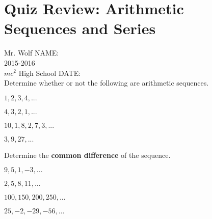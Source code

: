 \documentclass[12pt]{article}
\begin{document}
\section*{Quiz Review: Arithmetic Sequences and Series}

Mr. Wolf \hfill NAME:\underline{\hspace{3in}}\\
2015-2016\\
$mc^2$ High School \hfill DATE:\underline{\hspace{2in}}\\

Determine whether or not the following are arithmetic sequences.\\

\begin{enumerate}
\begin{multicols}{2}
\setlength\itemsep{1cm}

	\item $1,2,3,4,...$\\
	
	\item $4,3,2,1,...$\\
	
	\item $10,1,8,2,7,3,...$\\
	
	\item $3,9,27,...$\\

\end{multicols}
\end{enumerate}

Determine the \textbf{common difference} of the sequence.\\


\begin{enumerate}[resume]
\begin{multicols}{2}
\setlength\itemsep{1cm}

	\item $9,5,1,-3,...$\\
	
	\item $2,5,8,11,...$\\
	
	\item $100,150,200,250,...$\\
	
	\item $25,-2,-29,-56,...$\\

\end{multicols}
\end{enumerate}
\end{document}
